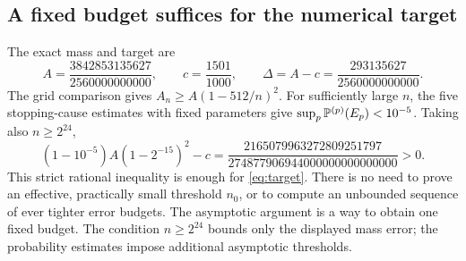 \subsection{A fixed budget suffices for the numerical target}
The exact mass and target are
\begin{equation}\label{eq:massnumbers}
 A =\frac{3842853135627}{2560000000000},\qquad
 c=\frac{1501}{1000},\qquad
 \Delta=A-c=\frac{293135627}{2560000000000}.
\end{equation}
The grid comparison gives \(A_n\ge A(1-512/n)^2\). For sufficiently
large \(n\), the five stopping-cause estimates with fixed parameters give
\(\sup_p\mathbb P^{(p)}(E_p)<10^{-5}\). Taking also \(n\ge2^{24}\),
\[
 (1-10^{-5})A(1-2^{-15})^2-c
 =\frac{2165079963272809251797}{274877906944000000000000000}>0.
\]
This strict rational inequality is enough for \eqref{eq:target}.
There is no need to prove an effective, practically small threshold
\(n_0\), or to compute an unbounded sequence of ever tighter error
budgets. The asymptotic argument is a way to obtain one fixed budget.
The condition \(n\ge2^{24}\) bounds only the displayed mass error;
the probability estimates impose additional asymptotic thresholds.

